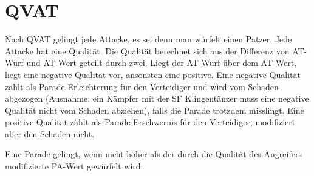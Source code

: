 %

\chapter{QVAT}
Nach QVAT gelingt jede Attacke, es sei denn man würfelt einen Patzer.
Jede Attacke hat eine Qualität.
Die Qualität berechnet sich aus der Differenz von AT-Wurf und AT-Wert geteilt durch zwei.
Liegt der AT-Wurf über dem AT-Wert, liegt eine negative Qualität vor, ansonsten eine positive.
Eine negative Qualität zählt als Parade-Erleichterung für den Verteidiger und wird vom Schaden abgezogen (Ausnahme: ein Kämpfer mit der SF Klingentänzer muss eine negative Qualität nicht vom Schaden abziehen), falls die Parade trotzdem misslingt.
Eine positive Qualität zählt als Parade-Erschwernis für den Verteidiger, modifiziert aber den Schaden nicht.

Eine Parade gelingt, wenn nicht höher als der durch die Qualität des Angreifers modifizierte PA-Wert gewürfelt wird.
